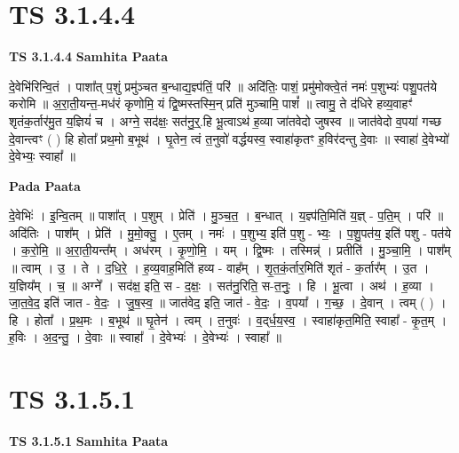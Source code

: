 \documentclass[17pt]{extarticle}
\begin{document}
\section*{ TS 3.1.4.4 }

\textbf{TS 3.1.4.4 } \newline
\textbf{Samhita Paata} \newline

दे॒वेभि॑रिन्वि॒तं । पाशा᳚त् प॒शुं प्रमु॑ञ्चत ब॒न्धाद्य॒ज्ञ्प॑तिं॒ परि॑ ॥ अदि॑तिः॒ पाशं॒ प्रमु॑मोक्त्वे॒तं नमः॑ प॒शुभ्यः॑ पशु॒पत॑ये करोमि ॥ अ॒रा॒ती॒यन्त॒-मध॑रं कृणोमि॒ यं द्वि॒ष्मस्तस्मि॒न् प्रति॑ मुञ्चामि॒ पाशं᳚ ॥ त्वामु॒ ते द॑धिरे हव्य॒वाहꣳ॑ शृतंक॒र्तार॑मु॒त य॒ज्ञियं॑ च । अग्ने॒ सद॑क्षः॒ सत॑नु॒र्॒.हि भू॒त्वाऽथ॑ ह॒व्या जा॑तवेदो जुषस्व ॥ जात॑वेदो व॒पया॑ गच्छ दे॒वान्त्वꣳ ( ) हि होता᳚ प्रथ॒मो ब॒भूथ॑ । घृ॒तेन॒ त्वं त॒नुवो॑ वर्द्धयस्व॒ स्वाहा॑कृतꣳ ह॒विर॑दन्तु दे॒वाः ॥ स्वाहा॑ दे॒वेभ्यो॑ दे॒वेभ्यः॒ स्वाहा᳚ ॥ \newline

\textbf{Pada Paata} \newline

दे॒वेभिः॑ । इ॒न्वि॒तम् ॥ पाशा᳚त् । प॒शुम् । प्रेति॑ । मु॒ञ्च॒त॒ । ब॒न्धात् । य॒ज्ञ्प॑ति॒मिति॑ य॒ज्ञ् - प॒ति॒म् । परि॑ ॥ अदि॑तिः । पाश᳚म् । प्रेति॑ । मु॒मो॒क्तु॒ । ए॒तम् । नमः॑ । प॒शुभ्य॒ इति॑ प॒शु - भ्यः॒ । प॒शु॒पत॑य॒ इति॑ पशु - पत॑ये । क॒रो॒मि॒ ॥ अ॒रा॒ती॒यन्त᳚म् । अध॑रम् । कृ॒णो॒मि॒ । यम् । द्वि॒ष्मः । तस्मिन्न्॑ । प्रतीति॑ । मु॒ञ्चा॒मि॒ । पाश᳚म् ॥ त्वाम् । उ॒ । ते । द॒धि॒रे॒ । ह॒व्य॒वाह॒मिति॑ हव्य - वाह᳚म् । शृ॒त॒कं॒र्तार॒मिति॑ शृतं - क॒र्तार᳚म् । उ॒त । य॒ज्ञिय᳚म् । च॒ ॥ अग्ने᳚ । सद॑क्ष॒ इति॒ स - द॒क्षः॒ । सत॑नु॒रिति॒ स-त॒नुः॒ । हि । भू॒त्वा । अथ॑ । ह॒व्या । जा॒त॒वे॒द॒ इति॑ जात - वे॒दः॒ । जु॒ष॒स्व॒ ॥ जात॑वेद॒ इति॒ जात॑ - वे॒दः॒ । व॒पया᳚ । ग॒च्छ॒ । दे॒वान् । त्वम् ( ) । हि । होता᳚ । प्र॒थ॒मः । ब॒भूथ॑ ॥ घृ॒तेन॑ । त्वम् । त॒नुवः॑ । व॒द्‌र्ध॒य॒स्व॒ । स्वाहा॑कृत॒मिति॒ स्वाहा᳚ - कृ॒त॒म् । ह॒विः । अ॒द॒न्तु॒ । दे॒वाः ॥ स्वाहा᳚ । दे॒वेभ्यः॑ । दे॒वेभ्यः॑ । स्वाहा᳚ ॥  \newline




\section*{ TS 3.1.5.1 }

\textbf{TS 3.1.5.1 } \newline
\textbf{Samhita Paata} \newline
\end{document}
